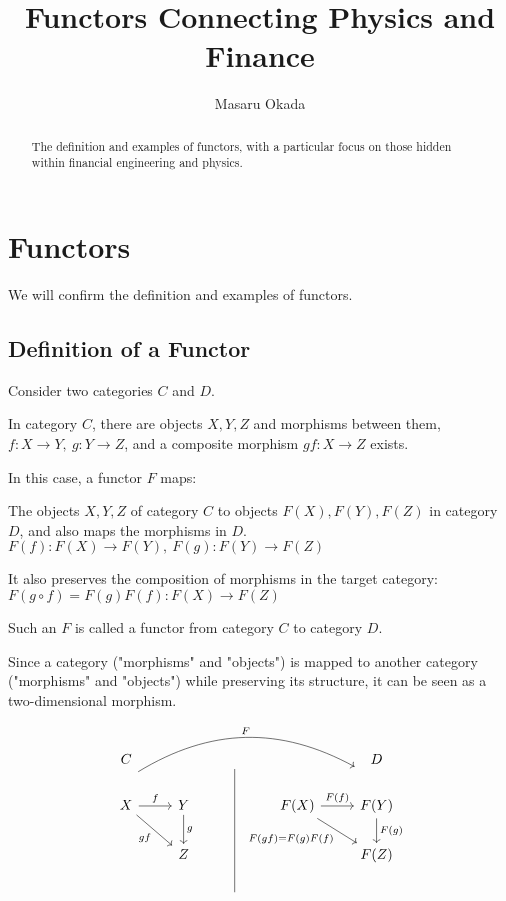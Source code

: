 \documentclass[uplatex,a4j,12pt,dvipdfmx]{jsarticle}
\title{
Functors Connecting Physics and Finance
}
\author{
Masaru Okada
}
\begin{document}
\maketitle

\begin{abstract}
	The definition and examples of functors, with a particular focus on those hidden within financial engineering and physics.
\end{abstract}


\section{Functors}

We will confirm the definition and examples of functors.

\subsection{Definition of a Functor}

Consider two categories $C$ and $D$.

In category $C$, there are objects $X,Y,Z$ and morphisms between them,
$f: X \to Y , \ g: Y \to Z$,
and a composite morphism
$gf: X \to  Z$
exists.

In this case, a functor $F$ maps:

The objects $X,Y,Z$ of category $C$ to objects $F(X),F(Y),F(Z)$ in category $D$,
and also maps the morphisms in $D$.
$F(f): F(X) \to F(Y) , \ F(g): F(Y) \to F(Z)$

It also preserves the composition of morphisms in the target category:
$F(g \circ f) = F(g) F(f): F(X) \to F(Z)$

Such an $F$ is called a functor from category $C$ to category $D$.

Since a category ("morphisms" and "objects") is mapped to another category ("morphisms" and "objects") while preserving its structure, it can be seen as a two-dimensional morphism.

\[
	\begin{tikzcd}
		C           &        & {}          &                  & D            \\
		X \arrow[r, "f"] \arrow[rd, "gf"'] \arrow[rrrr, "F", bend left, shift left=8] & Y \arrow[d, "g"] &         & F(X) \arrow[r, "F(f)"] \arrow[rd, "F(gf) = F(g)F(f)"'] & F(Y) \arrow[d, "F(g)"] \\
		& Z          &         &                                  & F(Z)         \\
		&            & {} \arrow[uuu, no head] &                                  &
	\end{tikzcd}
\]
\end{document}
